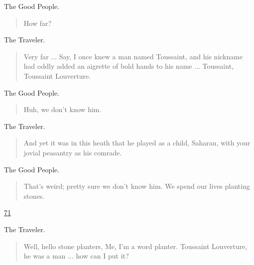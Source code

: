 \documentclass[letterpaper,article,12pt,oneside,notitlepage]{memoir}
\begin{document}
\begin{center}The Good People.\end{center}

\begin{verse}
How far? \\
\end{verse}

\begin{center}The Traveler.\end{center}

\begin{verse}
Very far ... Say, I once knew a man named Toussaint, and his nickname had oddly added an aigrette of bold hands to his name ... Toussaint, Toussaint Louverture. \\
\end{verse}

\begin{center}The Good People.\end{center}

\begin{verse}
Huh, we don't know him. \\
\end{verse}

\begin{center}The Traveler.\end{center}

\begin{verse}
And yet it was in this heath that he played as a child, Saharan, with your jovial peasantry as his comrade. \\
\end{verse}

\begin{center}The Good People.\end{center}

\begin{verse}
That's weird; pretty sure we don't know him. We spend our lives planting stones. \\
\end{verse}

\clearpage

\href{http://cesaire.elotroalex.com/chiens/chiens/p071.html}{71}

\begin{center}The Traveler.\end{center}

\begin{verse}
Well, hello stone planters, Me, I'm a word planter. Toussaint Louverture, he was a man ... how can I put it? \\
\end{verse}
\end{document}

